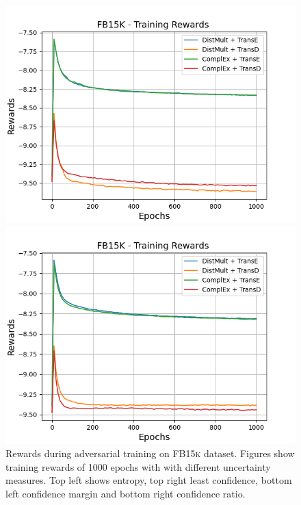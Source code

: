 \begin{figure}[H]
\begin{minipage}{.5\textwidth}
    \end{minipage}
    \begin{minipage}{.5\textwidth}
      \centering
      \includegraphics[width=0.9\linewidth]{figures/results/gan_train/not_pretrained/uncertainty/max_distribution/confidence_margin/fb15k/uncertainty_fb15k_rew.png}
    \end{minipage}%
    \begin{minipage}{.5\textwidth}
      \centering
      \includegraphics[width=0.9\linewidth]{figures/results/gan_train/not_pretrained/uncertainty/max_distribution/confidence_ratio/fb15k/uncertainty_fb15k_rew.png}
    \end{minipage}%
    \caption{Rewards during adversarial training on \textsc{FB15k} dataset. 
    Figures show training rewards of 1000 epochs with \ussoftmax with different uncertainty measures.
    Top left shows entropy, top right least confidence, 
    bottom left confidence margin and bottom right confidence ratio.}
    \label{fig:advtrain_metrics_fb15k_rew}
\end{figure}
